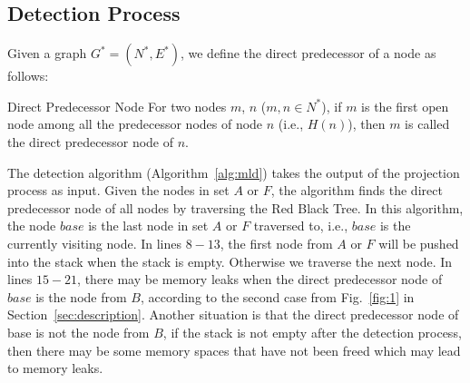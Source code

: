 \subsection{Detection Process}

Given a graph $G^*=(N^*, E^*)$, we define the direct predecessor of a node as follows:

\begin{definition}{Direct Predecessor Node}
For two nodes $m$, $n$ ($m, n\in N^*$), if $m$ is the first open node among all the predecessor nodes of node $n$ (i.e., $Η(n)$), then $m$ is called the direct predecessor node of $n$.
\end{definition}

The detection algorithm (Algorithm~\ref{alg:mld}) takes the output of the projection process as input. %
Given the nodes in set $A$ or $F$, the algorithm finds the direct predecessor node of all nodes by traversing the Red Black Tree. In this algorithm, the node $base$ is the last node in set $A$ or $F$ traversed to, i.e., $base$ is the currently visiting node. In lines $8-13$, the first node from $A$ or $F$ will be pushed into the stack when the stack is empty. Otherwise we traverse the next node. In lines $15-21$, there may be memory leaks when the direct predecessor node of $base$ is the node from $B$, according to the second case from Fig.~\ref{fig:1} in Section~\ref{sec:description}. Another situation is that the direct predecessor node of base is not the node from $B$, if the stack is not empty after the detection process, then there may be some memory spaces that have not been freed which may lead to memory leaks.

